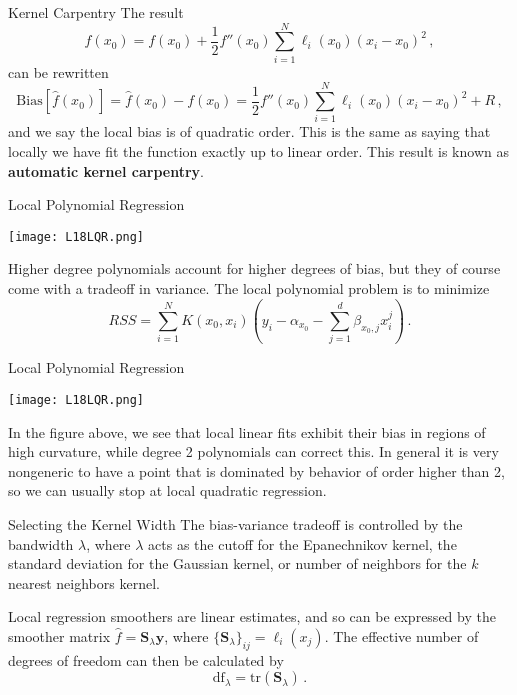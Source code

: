 \documentclass[10pt, table, dvipsnames,xcdraw,handout]{beamer}
\newcommand{\bfy}{\ensuremath{\mathbf{y}}}
\begin{document}
\begin{frame}[fragile]{Kernel Carpentry}
The result
$$
\hat{f}(x_0) = f(x_0) + \frac12f''(x_0)\sum_{i=1}^N\ell_i(x_0) (x_i-x_0) ^2\,,
$$
can be rewritten 
$$
\text{Bias}[\hat{f}(x_0)] = \hat{f}(x_0) - f(x_0)  = \frac12f''(x_0)\sum_{i=1}^N\ell_i(x_0) (x_i-x_0) ^2 + R\,,
$$
and we say the local bias is of quadratic order. \pause This is the same as saying that locally we have fit the function exactly up to linear order. This result is known as \textbf{automatic kernel carpentry}.
\end{frame}





\begin{frame}[fragile]{Local Polynomial Regression}
  \begin{minipage}[t][0.5\textheight][t]{\textwidth}
	\centering \texttt{[image: L18LQR.png]} 
  \end{minipage}
  \vfill
\begin{minipage}[t][0.5\textheight][t]{\textwidth}
Higher degree polynomials account for higher degrees of bias, but they of course come with a tradeoff in variance. The local polynomial problem is to minimize
$$
RSS = \sum_{i=1}^NK(x_0,x_i) \left( y_i - \alpha_{x_0} - \sum_{j=1}^d \beta_{x_0,j}x_i^j \right)\,.
$$
\end{minipage}
\end{frame}



\begin{frame}[fragile]{Local Polynomial Regression}
  \begin{minipage}[t][0.5\textheight][t]{\textwidth}
	\centering \texttt{[image: L18LQR.png]} 
  \end{minipage}
  \vfill
\begin{minipage}[t][0.5\textheight][t]{\textwidth}
In the figure above, we see that local linear fits exhibit their bias in regions of high curvature, while degree 2 polynomials can correct this. \pause In general it is very nongeneric to have a point that is dominated by behavior of order higher than 2, so we can usually stop at local quadratic regression. 
\end{minipage}
\end{frame}




\begin{frame}[fragile]{Selecting the Kernel Width}
The bias-variance tradeoff is controlled by the bandwidth $\lambda$, where $\lambda$ acts as the cutoff for the Epanechnikov kernel, the standard deviation for the Gaussian kernel, or number of neighbors for the $k$ nearest neighbors kernel. \pause

Local regression smoothers are linear estimates, and so can be expressed by the smoother matrix $\hat f =\mathbf{S}_\lambda\bfy$, where $\{\mathbf{S}_\lambda\}_{ij} = \ell_i(x_j)$. \pause The effective number of degrees of freedom can then be calculated by
$$
\text{df}_\lambda = \text{tr}(\mathbf{S}_\lambda)\,.
$$
\end{frame}
\end{document}
